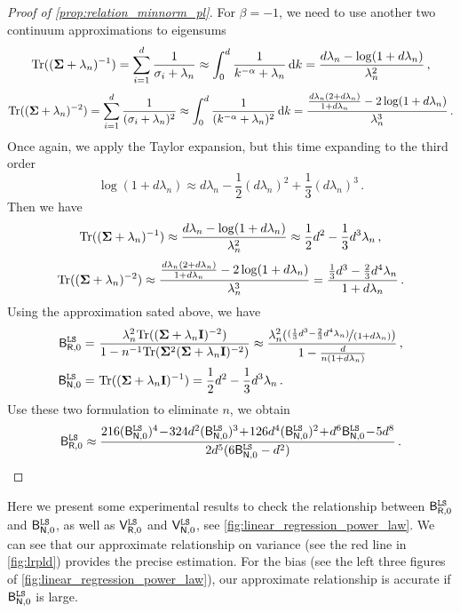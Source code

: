 \begin{proof}[Proof of \cref{prop:relation_minnorm_pl}]
For $\beta=-1$, we need to use another two continuum approximations to eigensums
\begin{equation*}
    {\rm Tr}(({\boldsymbol \Sigma}+\lambda_n)^{-1}) = \sum_{i=1}^{d} \frac{1}{\sigma_i + \lambda_n} \approx \int_{0}^{d} \frac{1}{k^{-\alpha} + \lambda_n}\, \mathrm{d}k = \frac{d\lambda_n - \log(1+d\lambda_n)}{\lambda_n^2}\,,
\end{equation*}
\begin{equation*}
    {\rm Tr}(({\boldsymbol \Sigma}+\lambda_n)^{-2}) = \sum_{i=1}^{d} \frac{1}{(\sigma_i + \lambda_n)^2} \approx \int_{0}^{d} \frac{1}{(k^{-\alpha} + \lambda_n)^2}\, \mathrm{d}k = \frac{\frac{d\lambda_n(2+d\lambda_n)}{1+d\lambda_n}-2\log(1+d\lambda_n)}{\lambda_n^3}\,.
\end{equation*}
Once again, we apply the Taylor expansion, but this time expanding to the third order
\[
\log(1 + d\lambda_n) \approx d\lambda_n - \frac{1}{2}(d\lambda_n)^2 + \frac{1}{3}(d\lambda_n)^3\,.
\]
Then we have
\begin{equation*}
    {\rm Tr}(({\boldsymbol \Sigma}+\lambda_n)^{-1}) \approx \frac{d\lambda_n - \log(1+d\lambda_n)}{\lambda_n^2} \approx \frac{1}{2}d^2-\frac{1}{3}d^3\lambda_n\,,
\end{equation*}
\begin{equation*}
    {\rm Tr}(({\boldsymbol \Sigma}+\lambda_n)^{-2}) \approx \frac{\frac{d\lambda_n(2+d\lambda_n)}{1+d\lambda_n}-2\log(1+d\lambda_n)}{\lambda_n^3} = \frac{\frac{1}{3}d^3-\frac{2}{3}d^4\lambda_n}{1+d\lambda_n}\,.
\end{equation*}
Using the approximation sated above, we have
\[
\begin{aligned}
    \mathsf B_{\mathsf R,0}^{\tt LS} =&~ \frac{\lambda_n^2{\rm Tr}(({\boldsymbol \Sigma}+\lambda_n{\mathbf I})^{-2})}{1-n^{-1}{\rm Tr}({\boldsymbol \Sigma}^2({\boldsymbol \Sigma}+\lambda_n{\mathbf I})^{-2})} \approx \frac{\lambda_n^2(\nicefrac{(\frac{1}{3}d^3-\frac{2}{3}d^4\lambda_n)}{(1+d\lambda_n)})}{1-\frac{d}{n(1+d\lambda_n)}} \,,\\
    \mathsf B_{\mathsf N,0}^{\tt LS} =&~ {\rm Tr}(({\boldsymbol \Sigma}+\lambda_n{\mathbf I})^{-1}) = \frac{1}{2}d^2-\frac{1}{3}d^3\lambda_n \,.\\
\end{aligned}
\]
Use these two formulation to eliminate $n$, we obtain
\[
\sB_{\sR,0}^{\tt LS} \approx \frac{216 (\sB_{\sN, 0}^{\tt LS})^4 \!-\! 324d^2 (\sB_{\sN, 0}^{\tt LS})^3 \!+\! 126d^4 (\sB_{\sN, 0}^{\tt LS})^2 \!+\! d^6 \sB_{\sN, 0}^{\tt LS} \!-\! 5d^8}{2d^5(6 \sB_{\sN, 0}^{\tt LS}-d^2)}\,.
\]
\end{proof}

Here we present some experimental results to check the relationship between $\mathsf B_{\mathsf R,0}^{\tt LS}$ and $\mathsf B_{\mathsf N,0}^{\tt LS}$, as well as $\mathsf V_{\mathsf R,0}^{\tt LS}$ and $\mathsf V_{\mathsf N,0}^{\tt LS}$, see \cref{fig:linear_regression_power_law}.
We can see that our approximate relationship on variance (see the {\color{red}red} line in \cref{fig:lrpld}) provides the precise estimation.
For the bias (see the left three figures of \cref{fig:linear_regression_power_law}), our approximate relationship is accurate if $\mathsf B_{\mathsf N,0}^{\tt LS}$ is large.



